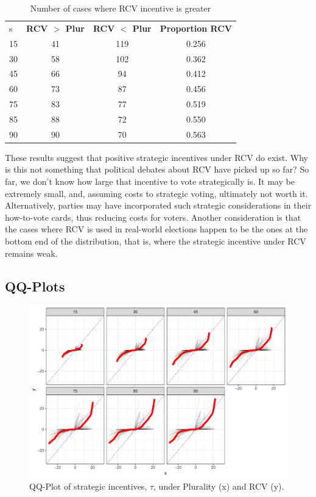 \documentclass[11pt, letter]{article}
\begin{document}
\begin{table}[!htb]
	\caption{Number of cases where RCV incentive is greater}
	\label{tab:strat_inc}
	\centering

	\begin{tabular}{lccc}
	\toprule
	s & \textbf{RCV $>$ Plur} & \textbf{RCV $<$ Plur} & \textbf{Proportion RCV} \\
	\cmidrule{2-4}
	15 & 41 & 119 & 0.256 \\
	30 & 58 & 102 & 0.362 \\
	45 & 66 & 94 & 0.412 \\
	60 & 73 & 87 & 0.456 \\
	75 & 83 & 77 & 0.519 \\
	85 & 88 & 72 & 0.550 \\
	90 & 90 & 70 & 0.563 \\
	\bottomrule
	\end{tabular}
\end{table}

These results suggest that positive strategic incentives under RCV do exist. Why is this not something that political debates about RCV have picked up so far? So far, we don't know how large that incentive to vote strategically is. It may be extremely small, and, assuming costs to strategic voting, ultimately not worth it. Alternatively, parties may have incorporated such strategic considerations in their how-to-vote cards, thus reducing costs for voters.
Another consideration is that the cases where RCV is used in real-world elections happen to be the ones at the bottom end of the distribution, that is, where the strategic incentive under RCV remains weak.

\subsection{QQ-Plots}

\begin{figure}[!h]
	\centering
	\includegraphics[width = .8 \textwidth]{"../output/figures/cses_qq"}
	\caption{QQ-Plot of strategic incentives, $\tau$, under Plurality (x) and RCV (y).}
	\label{fig:qqplots}
\end{figure}
\end{document}
